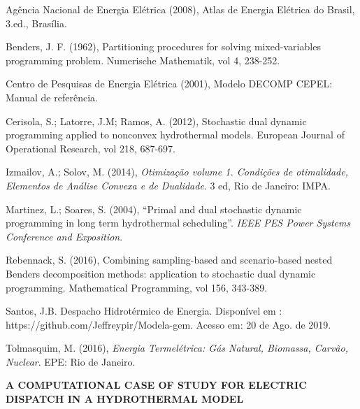 \documentclass[12pt,fleqn]{article}
\begin{document}
\begin{description}[noitemsep, labelindent=-0.2cm,leftmargin=0.4cm]
\fontsize{11}{0}\selectfont
\item
Ag\^encia Nacional de Energia El\'etrica (2008), Atlas de Energia Elétrica do Brasil, 3.ed., Brasília.
\item
Benders, J. F. (1962), Partitioning procedures for solving mixed-variables programming problem. Numerische Mathematik,
vol 4, 238-252.
\item
Centro de Pesquisas de Energia Elétrica (2001), Modelo DECOMP CEPEL: Manual de refer\^encia.
\item
Cerisola, S.; Latorre, J.M; Ramos, A. (2012), Stochastic dual dynamic programming applied to nonconvex hydrothermal models.
European Journal of Operational Research, vol 218, 687-697.
\item
Izmailov, A.; Solov, M. (2014), {\em Otimiza\c c\~ao volume 1. Condi\c c\~oes de otimalidade, Elementos de An\'alise Convexa e
de Dualidade}. 3 ed, Rio de Janeiro: IMPA. 
\item
Martinez, L.; Soares, S. (2004), ``Primal and dual stochastic dynamic programming in long term hydrothermal scheduling''.
{\em IEEE PES Power Systems Conference and Exposition}.
\item
Rebennack, S. (2016), Combining  sampling-based and scenario-based nested Benders decomposition methods: application to
stochastic dual dynamic programming. Mathematical Programming, vol 156, 343-389. 
\item
Santos, J.B. Despacho Hidrot\'ermico de Energia. Dispon\'ivel em : https://github.com/Jeffreypir/Modela-gem. Acesso em: 20 de Ago. de 2019.
\item
  Tolmasquim, M. (2016), {\em Energia Termel\'etrica: G\'as Natural, Biomassa, Carv\~ao, Nuclear}. EPE: Rio de Janeiro.
\end{description}
\vspace*{-0.1cm}


\begin{center}
 \textbf {A COMPUTATIONAL CASE OF STUDY FOR ELECTRIC DISPATCH IN A HYDROTHERMAL MODEL}
\end{center}

\def\abstractname{Abstract}%
\end{document}

